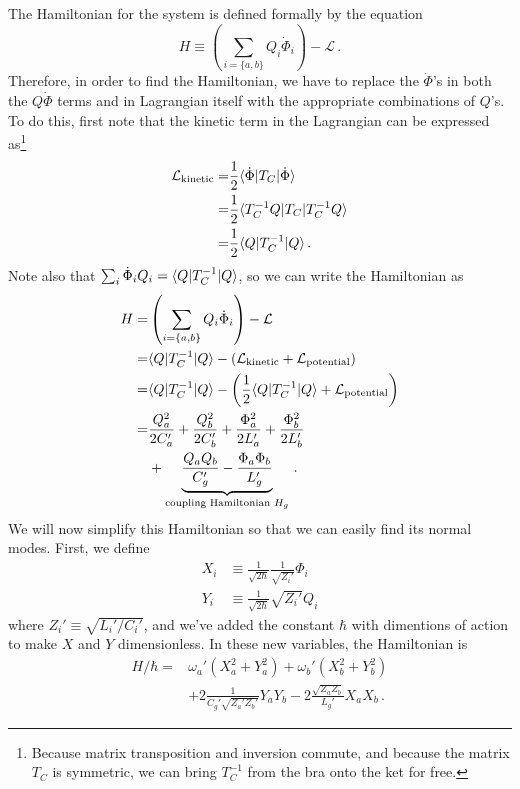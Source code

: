 \documentclass{article}
\begin{document}
The Hamiltonian for the system is defined formally by the equation
\begin{equation*}
  H \equiv \left( \sum_{i = \{a, b\}} Q_i \dot \Phi_i \right) - \mathcal{L} \, .
\end{equation*}
Therefore, in order to find the Hamiltonian, we have to replace the $\dot \Phi$'s in both the $Q \dot \Phi$ terms and in Lagrangian itself with the appropriate combinations of $Q$'s.
To do this, first note that the kinetic term in the Lagrangian can be expressed as\footnote{Because matrix transposition and inversion commute, and because the matrix $T_C$ is symmetric, we can bring $T_C^{-1}$ from the bra onto the ket for free.}
\begin{align*}
  \mathcal{L}_\text{kinetic}
  =& \frac{1}{2} \langle \dot \Phi | T_C | \dot \Phi \rangle \\
  =& \frac{1}{2} \langle T_C^{-1} Q | T_C | T_C^{-1} Q \rangle \\
  =& \frac{1}{2} \langle Q | T_C^{-1} | Q \rangle
  \, .
\end{align*}
Note also that $\sum_i \dot \Phi_i Q_i = \langle Q | T_C^{-1} | Q \rangle$, so we can write the Hamiltonian as
\begin{align}
  H
  =& \left( \sum_{i = \{a, b\}} Q_i \dot \Phi_i \right) - \mathcal{L} \nonumber \\
  =& \langle Q | T_C^{-1} | Q \rangle - \left( \mathcal{L}_\text{kinetic} + \mathcal{L}_\text{potential} \right) \nonumber \\
  =& \langle Q | T_C^{-1} | Q \rangle - \left( \frac{1}{2} \langle Q | T_C^{-1} | Q \rangle + \mathcal{L}_\text{potential} \right) \nonumber \\
  =& \frac{Q_a^2}{2 C_a'} + \frac{Q_b^2}{2 C_b'} + \frac{\Phi_a^2}{2 L_a'} + \frac{\Phi_b^2}{2 L_b'} \nonumber \\
  &+ \underbrace{\frac{Q_a Q_b}{C_g'} - \frac{\Phi_a \Phi_b}{L_g'}}_{\text{coupling Hamiltonian }H_g}
  \, .
\end{align}
We will now simplify this Hamiltonian so that we can easily find its normal modes.
First, we define
\begin{align*}
  X_i &\equiv \frac{1}{\sqrt{2 \hbar}} \frac{1}{\sqrt{Z_i'}} \Phi_i \\
  Y_i &\equiv \frac{1}{\sqrt{2 \hbar}} \sqrt{Z_i'} Q_i
\end{align*}
where $Z_i' \equiv \sqrt{L_i' / C_i'}$, and we've added the constant $\hbar$ with dimentions of action to make $X$ and $Y$ dimensionless.
In these new variables, the Hamiltonian is
\begin{align}
  H / \hbar
  =& \omega_a' \left(X_a^2 + Y_a^2 \right)
  +  \omega_b' \left(X_b^2 + Y_b^2 \right) \nonumber \\
  &+ 2 \frac{1}{C_g' \sqrt{Z_a' Z_b'}} Y_a Y_b
   - 2 \frac{\sqrt{Z_a Z_b}}{L_g'} X_a X_b
  \, .
\end{align}
\end{document}
